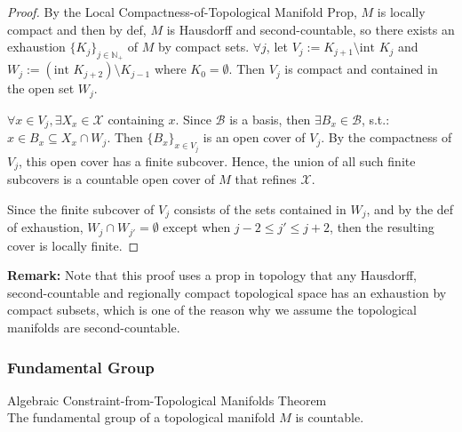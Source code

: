 \begin{proof}
    By the Local Compactness-of-Topological Manifold Prop, $M$ is locally compact and then by def, $M$ is Hausdorff and second-countable, so there exists an exhaustion $\{K_j\}_{j \in \mathbb{N}_+}$ of $M$ by compact sets. $\forall j$, let $V_j := K_{j+1} \setminus \text{int }K_j$ and $W_j:= (\text{int }K_{j+2} )\setminus K_{j-1}$ where $K_0=\emptyset$. Then $V_j$ is compact and contained in the open set $W_j$.

    $\forall x\in V_j, \exists X_x \in \mathcal{X}$ containing $x$. Since $\mathcal{B}$ is a basis, then $\exists B_x\in \mathcal{B}$, s.t.: $x\in B_x \subseteq X_x \cap W_j$. Then $\{ B_x\}_{x\in V_j}$ is an open cover of $V_j$. By the compactness of $V_j$, this open cover has a finite subcover. Hence, the union of all such finite subcovers is a countable open cover of $M$ that refines $\mathcal{X}$.

    Since the finite subcover of $V_j$ consists of the sets contained in $W_j$, and by the def of exhaustion, $W_j \cap W_{j'}=\emptyset$ except when $j-2\leq j'\leq j+2$, then the resulting cover is locally finite.
\end{proof}

\noindent\textbf{Remark:} Note that this proof uses a prop in topology that any Hausdorff, second-countable and regionally compact topological space has an exhaustion by compact subsets, which is one of the reason why we assume the topological manifolds are second-countable.

\subsubsection{Fundamental Group}

\begin{theorem}{Algebraic Constraint-from-Topological Manifolds Theorem}\\
The fundamental group of a topological manifold $M$ is countable.
\end{theorem}

